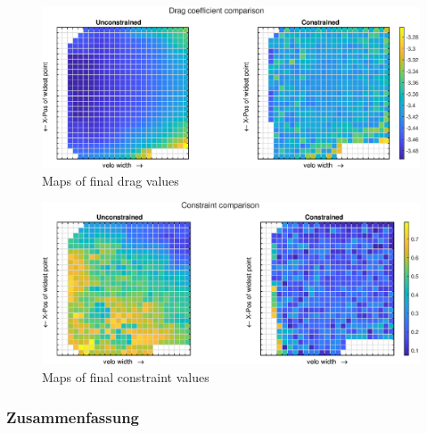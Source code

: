 \begin{figure}[h]
	\includegraphics[width=1\linewidth]{bilder/6pt1000Samples/dragMapComparison}
	\caption{Maps of final drag values}
	\label{fig:3rdmapDrag}
\end{figure}


\begin{figure}[h]
	\includegraphics[width=1\linewidth]{bilder/6pt1000Samples/constraintMapComparison}
	\caption{Maps of final constraint values}
	\label{fig:3rdmapCon}
\end{figure}


\subsubsection{Zusammenfassung}




